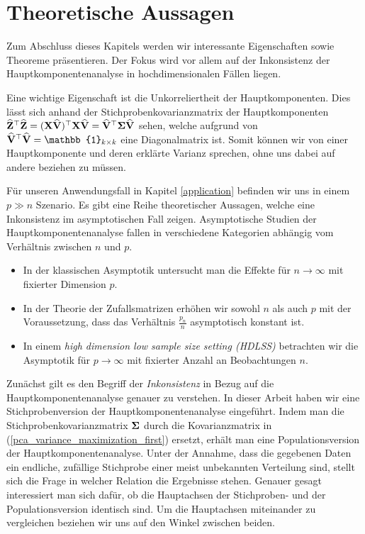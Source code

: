 

\section{Theoretische Aussagen}
\label{pca_theorems}

Zum Abschluss dieses Kapitels werden wir interessante Eigenschaften sowie Theoreme präsentieren. Der Fokus wird vor allem auf der Inkonsistenz der Hauptkomponentenanalyse in hochdimensionalen Fällen liegen.

Eine wichtige Eigenschaft ist die Unkorreliertheit der Hauptkomponenten. Dies lässt sich anhand der Stichprobenkovarianzmatrix der Hauptkomponenten $\widehat{\mathbf{Z}}^{\top} \widehat{\mathbf{Z}} = (\mathbf{X} \widehat{\mathbf{V}})^{\top}\mathbf{X} \widehat{\mathbf{V}} = \widehat{\mathbf{V}}^{\top}\mathbf{\Sigma}\widehat{\mathbf{V}}$ sehen, welche aufgrund von $\widehat{\mat V}^{\top} \widehat{\mat V} = \mat{\mathbb{1}}_{k \times k}$ eine Diagonalmatrix ist. Somit können wir von einer Hauptkomponente und deren erklärte Varianz sprechen, ohne uns dabei auf andere beziehen zu müssen.

Für unseren Anwendungsfall in Kapitel \ref{application} befinden wir uns in einem $p \gg n$ Szenario. Es gibt eine Reihe theoretischer Aussagen, welche eine Inkonsistenz im asymptotischen Fall zeigen. Asymptotische Studien der Hauptkomponentenanalyse fallen in verschiedene Kategorien abhängig vom Verhältnis zwischen $n$ und $p$.
\begin{itemize}
\item In der klassischen Asymptotik untersucht man die Effekte für $n \rightarrow \infty$ mit fixierter Dimension $p$.
\item In der Theorie der Zufallsmatrizen erhöhen wir sowohl $n$ als auch $p$ mit der Voraussetzung, dass das Verhältnis $\frac{p_n}{n}$ asymptotisch konstant ist.
\item In einem \textit{high dimension low sample size setting (HDLSS)} betrachten wir die Asymptotik für $p \rightarrow \infty$ mit fixierter Anzahl an Beobachtungen $n$.
\end{itemize}
Zunächst gilt es den Begriff der \textit{Inkonsistenz} in Bezug auf die Hauptkomponentenanalyse genauer zu verstehen. In dieser Arbeit haben wir eine Stichprobenversion der Hauptkomponentenanalyse eingeführt. Indem man die Stichprobenkovarianzmatrix $\mathbf{\Sigma}$ durch die Kovarianzmatrix in (\ref{pca_variance_maximization_first}) ersetzt, erhält man eine Populationsversion der Hauptkomponentenanalyse. Unter der Annahme, dass die gegebenen Daten ein endliche, zufällige Stichprobe einer meist unbekannten Verteilung sind, stellt sich die Frage in welcher Relation die Ergebnisse stehen. Genauer gesagt interessiert man sich dafür, ob die Hauptachsen der Stichproben- und der Populationsversion identisch sind. Um die Hauptachsen miteinander zu vergleichen beziehen wir uns auf den Winkel zwischen beiden.

